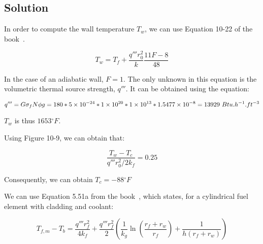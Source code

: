 \subsection{Solution}


In order to compute the wall temperature $T_w$, we can use Equation 10-22 of the book~\cite{book01}.

\begin{equation}
T_w = T_f + \frac{q'''r_0^2}{k}\frac{11F-8}{48}
\end{equation}

In the case of an adiabatic wall, $F = 1$. The only unknown in this equation is the volumetric thermal source strength, $q'''$. It can be obtained using the equation:

\begin{equation}
q''' = G \sigma_f N \phi g = 180 * \text{\num{5e-24}} * \text{\num{1e20}} * \text{\num{1e13}} * \text{\num{1.5477e-8}} = 13929\ Btu.h^{-1}.ft^{-3}
\end{equation}

$T_w$ is thus $1653{}^\circ F$.

Using Figure 10-9, we can obtain that:

\begin{equation}
\frac{T_w - T_c}{q'''r_0^2/2k_f} = 0.25
\end{equation}

Consequently, we can obtain $T_c = -88{}^\circ F$ 












































We can use Equation 5.51a from the book~\cite{book01}, which states, for a cylindrical fuel element with cladding and coolant:

\begin{equation}
T_{f,m} - T_b = \frac{q''' r_f^2}{4 k_f} + \frac{q'''r_f^2}{2} \left( \frac{1}{k_g} \ln \left( \frac{r_f + r_w}{r_f} \right) + \frac{1}{h(r_f + r_w)} \right)
\end{equation}

